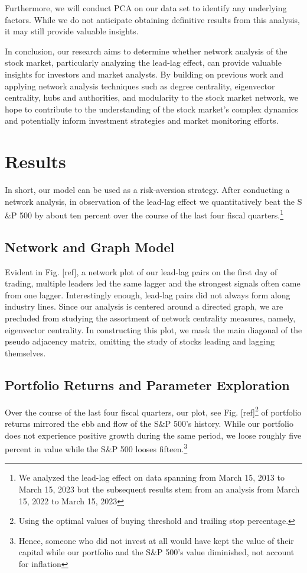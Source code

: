 \documentclass{article}
\begin{document}
Furthermore, we will conduct PCA on our data set to identify any underlying factors. While we do not anticipate obtaining definitive results from this analysis, it may still provide valuable insights.

In conclusion, our research aims to determine whether network analysis of the stock market, particularly analyzing the lead-lag effect, can provide valuable insights for investors and market analysts. By building on previous work and applying network analysis techniques such as degree centrality, eigenvector centrality, hubs and authorities, and modularity to the stock market network, we hope to contribute to the understanding of the stock market's complex dynamics and potentially inform investment strategies and market monitoring efforts.
\section{Results}
In short, our model can be used as a risk-aversion strategy. After conducting a network analysis, in observation of the lead-lag effect we quantitatively beat the S$\&$P 500 by about ten percent over the course of the last four fiscal quarters.\footnote{We analyzed the lead-lag effect on data spanning from March 15, 2013 to March 15, 2023 but the subsequent results stem from an analysis from March 15, 2022 to March 15, 2023}
\subsection{Network and Graph Model}
Evident in Fig. [ref], a network plot of our lead-lag pairs on the first day of trading, multiple leaders led the same lagger and the strongest signals often came from one lagger. Interestingly enough, lead-lag pairs did not always form along industry lines. Since our analysis is centered around a directed graph, we are precluded from studying the assortment of network centrality measures, namely, eigenvector centrality. In constructing this plot, we mask the main diagonal of the pseudo adjacency matrix, omitting the study of stocks leading and lagging themselves.
\subsection{Portfolio Returns and Parameter Exploration}
Over the course of the last four fiscal quarters, our plot, see Fig. [ref]\footnote{Using the optimal values of buying threshold and trailing stop percentage.} of portfolio returns mirrored the ebb and flow of the S$\&$P 500's history. While our portfolio does not experience positive growth during the same period, we loose roughly five percent in value while the S$\&$P 500 looses fifteen.\footnote{Hence, someone who did not invest at all would have kept the value of their capital while our portfolio and the S$\&$P 500's value diminished, not account for inflation}
\end{document}
